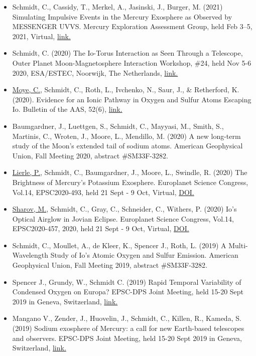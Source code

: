 \documentclass[12pt]{report}
\begin{document}
\begin{itemize}
   \item Schmidt, C., Cassidy, T., Merkel, A., Jasinski, J., Burger, M. (2021) Simulating Impulsive Events in the Mercury Exosphere as Observed by MESSENGER UVVS. Mercury Exploration Assessment Group, held Feb 3–5, 2021, Virtual, \href{https://www.hou.usra.edu/meetings/mexag2021/pdf/mexag2021_program.htm#sess201}{link.} 
   \item Schmidt, C. (2020) The Io-Torus Interaction as Seen Through a Telescope, Outer Planet Moon-Magnetosphere Interaction Workshop, \#24, held Nov 5-6 2020, ESA/ESTEC, Noorwijk, The Netherlands, \href{https://indico.esa.int/event/337/contributions/5611/contribution.pdf}{link.} 
   \item \underline{Moye, C.}, Schmidt, C., Roth, L., Ivchenko, N., Saur, J., \& Retherford, K. (2020). Evidence for an Ionic Pathway in Oxygen and Sulfur Atoms Escaping Io. Bulletin of the AAS, 52(6), \href{https://baas.aas.org/pub/2020n6i318p02}{link.}
   \item Baumgardner, J., Luettgen, S., Schmidt, C., Mayyasi, M., Smith, S., Martinis, C., Wroten, J., Moore, L., Mendillo, M. (2020) A new long-term study of the Moon’s extended tail of sodium atoms. American Geophysical Union, Fall Meeting 2020, abstract \#SM33F-3282.
   \item \underline{Lierle, P.}, Schmidt, C., Baumgardner, J., Moore, L., Swindle, R. (2020) The Brightness of Mercury's Potassium Exosphere. Europlanet Science Congress, Vol.14, EPSC2020-493, held 21 Sept - 9 Oct, Virtual, \href{https://doi.org/10.5194/epsc2020-493}{DOI.}
   \item \underline{Sharov, M.}, Schmidt, C., Gray, C., Schneider, C., Withers, P. (2020) Io's Optical Airglow in Jovian Eclipse. Europlanet Science Congress, Vol.14, EPSC2020-457, 2020, held 21 Sept - 9 Oct, Virtual, \href{https://doi.org/10.5194/epsc2020-457}{DOI.}
   \item Schmidt, C., Moullet, A., de Kleer, K., Spencer J., Roth, L. (2019) A Multi-Wavelength Study of Io's Atomic Oxygen and Sulfur Emission. American Geophysical Union, Fall Meeting 2019, abstract \#SM33F-3282.
   \item Spencer J., Grundy, W., Schmidt C. (2019) Rapid Temporal Variability of Condensed Oxygen on Europa? EPSC-DPS Joint Meeting, held 15-20 Sept 2019 in Geneva, Switzerland, \href{https://meetingorganizer.copernicus.org/EPSC-DPS2019/EPSC-DPS2019-935-1.pdf}{link.}
   \item Mangano V., Zender, J., Huovelin, J., Schmidt, C., Killen, R., Kameda, S. (2019) Sodium exosphere of Mercury: a call for new Earth-based telescopes and observers. EPSC-DPS Joint Meeting, held 15-20 Sept 2019 in Geneva, Switzerland, \href{https://meetingorganizer.copernicus.org/EPSC-DPS2019/EPSC-DPS2019-1967-2.pdf}{link.}

\end{itemize}
\end{document}

